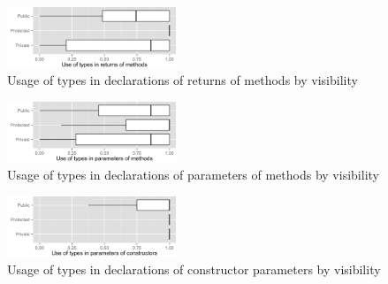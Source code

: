 \documentclass[preprint]{sigplanconf}
\begin{document}
% 
% 


\begin{figure}[h]
\centering 
\includegraphics[width=0.45\textwidth]{../analysis/result/all/boxplots/11_returns_of_methods.png} 
\caption{Usage of types in declarations of returns of methods by visibility}
\label{fig:all_boxplot_visibility_methodReturn} 
\end{figure}

\begin{figure}[h]
\centering 
\includegraphics[width=0.45\textwidth]{../analysis/result/all/boxplots/14_parameters_of_methods.png} 
\caption{Usage of types in declarations of parameters of methods by visibility}
\label{fig:all_boxplot_visibility_methodParameter} 
\end{figure}

\begin{figure}[h]
\centering 
\includegraphics[width=0.45\textwidth]{../analysis/result/all/boxplots/17_parameters_of_constructors.png} 
\caption{Usage of types in declarations of constructor parameters by visibility}
\label{fig:all_boxplot_visibility_constructorParameter} 
\end{figure}
\end{document}
